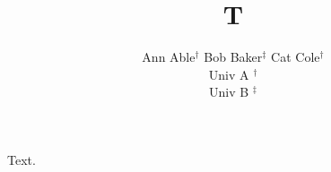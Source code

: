 \documentclass{article}
\title{T}
\author{Ann Able$^{\dagger}$ \quad Bob Baker$^{\ddagger}$ \quad Cat Cole$^{\dagger}$ \\ Univ A $^{\dagger}$ \\ Univ B $^{\ddagger}$}
\begin{document}
\maketitle
Text.
\end{document}
